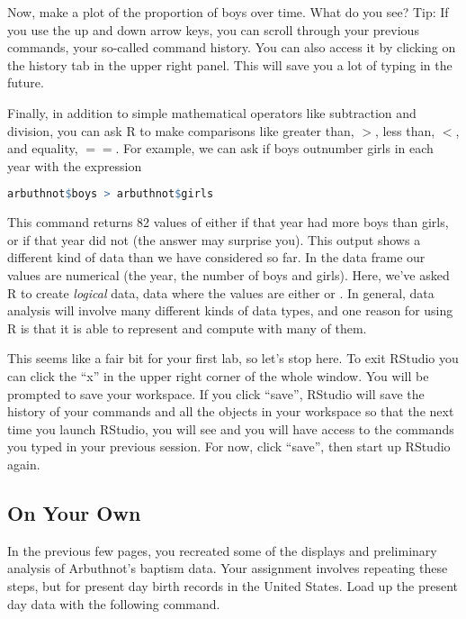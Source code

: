 \documentclass[11pt]{article}
\begin{document}
\begin{exercise}
Now, make a plot of the proportion of boys over time. What do you see? Tip: If you use the up and down arrow keys, you can scroll through your previous commands, your so-called command history. You can also access it by clicking on the history tab in the upper right panel.  This will save you a lot of typing in the future.
\end{exercise}

Finally, in addition to simple mathematical operators like subtraction and division, you can ask R to make comparisons like greater than, $>$, less than, $<$, and equality, $==$. For example, we can ask if boys outnumber girls in each year with the expression

\begin{lstlisting}[language=R]
arbuthnot$boys > arbuthnot$girls
\end{lstlisting}

This command returns 82 values of either  if that year had more boys than girls, or  if that year did not (the answer may surprise you). This output shows a different kind of data than we have considered so far. In the  data frame our values are numerical (the year, the number of boys and girls). Here, we've asked R to create \emph{logical} data, data where the values are either  or . In general, data analysis will involve many different kinds of data types, and one reason for using R is that it is able to represent and compute with many of them.

This seems like a fair bit for your first lab, so let's stop here. To exit RStudio you can click the ``x'' in the upper right corner of the whole window.  You will be prompted to save your workspace. If you click ``save'', RStudio will save the history of your commands and all the objects in your workspace so that the next time you launch RStudio, you will see  and you will have access to the commands you typed in your previous session. For now, click ``save'', then start up RStudio again.

\pagebreak

\subsection*{On Your Own}

In the previous few pages, you recreated some of the displays and preliminary analysis of Arbuthnot's baptism data. Your assignment involves repeating these steps, but for present day birth records in the United States.  Load up the present day data with the following command.
\end{document}
